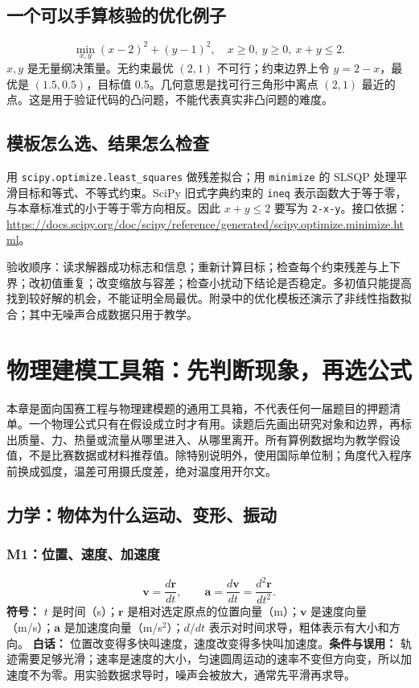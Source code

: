 \documentclass[UTF8,zihao=-4,openany,oneside,fontset=windows]{ctexbook}
\begin{document}
\section{一个可以手算核验的优化例子}
\begin{equation}\min_{x,y}(x-2)^2+(y-1)^2,\quad x\ge0,\ y\ge0,\ x+y\le2.\end{equation}
$x,y$ 是无量纲决策量。无约束最优 $(2,1)$ 不可行；约束边界上令 $y=2-x$，最优是 $(1.5,0.5)$，目标值 0.5。几何意思是找可行三角形中离点 $(2,1)$ 最近的点。这是用于验证代码的凸问题，不能代表真实非凸问题的难度。

\section{模板怎么选、结果怎么检查}
用 \texttt{scipy.optimize.least\_squares} 做残差拟合；用 \texttt{minimize} 的 SLSQP 处理平滑目标和等式、不等式约束。SciPy 旧式字典约束的 \texttt{ineq} 表示函数大于等于零，与本章标准式的小于等于零方向相反。因此 $x+y\le2$ 要写为 \texttt{2-x-y}。接口依据：\url{https://docs.scipy.org/doc/scipy/reference/generated/scipy.optimize.minimize.html}。

验收顺序：读求解器成功标志和信息；重新计算目标；检查每个约束残差与上下界；改初值重复；改变缩放与容差；检查小扰动下结论是否稳定。多初值只能提高找到较好解的机会，不能证明全局最优。附录中的优化模板还演示了非线性指数拟合；其中无噪声合成数据只用于教学。

\chapter{物理建模工具箱：先判断现象，再选公式}
本章是面向国赛工程与物理建模题的通用工具箱，不代表任何一届题目的押题清单。一个物理公式只有在假设成立时才有用。读题后先画出研究对象和边界，再标出质量、力、热量或流量从哪里进入、从哪里离开。所有算例数据均为教学假设值，不是比赛数据或材料推荐值。除特别说明外，使用国际单位制；角度代入程序前换成弧度，温差可用摄氏度差，绝对温度用开尔文。

\section{力学：物体为什么运动、变形、振动}
\subsection{M1：位置、速度、加速度}
\begin{equation}
\mathbf v=\frac{d\mathbf r}{dt},\qquad \mathbf a=\frac{d\mathbf v}{dt}=\frac{d^2\mathbf r}{dt^2}.
\end{equation}
\textbf{符号：} $t$ 是时间（s）；$\mathbf r$ 是相对选定原点的位置向量（m）；$\mathbf v$ 是速度向量（m/s）；$\mathbf a$ 是加速度向量（m/s$^2$）；$d/dt$ 表示对时间求导，粗体表示有大小和方向。
\textbf{白话：} 位置改变得多快叫速度，速度改变得多快叫加速度。\textbf{条件与误用：} 轨迹需要足够光滑；速率是速度的大小，匀速圆周运动的速率不变但方向变，所以加速度不为零。用实验数据求导时，噪声会被放大，通常先平滑再求导。
\end{document}
